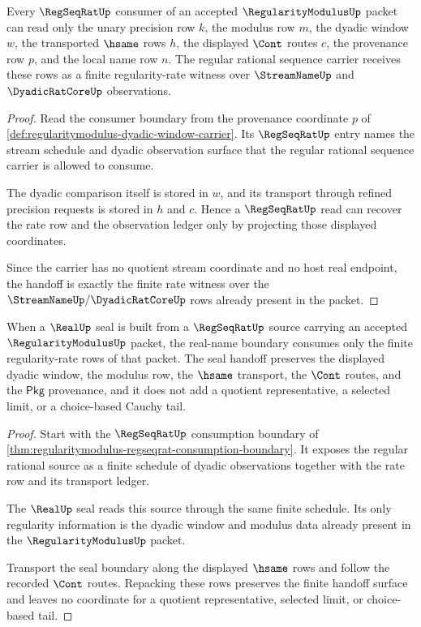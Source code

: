 \begin{theorem}
\label{thm:regularitymodulus-regseqrat-consumption-boundary}
Every $\RegSeqRatUp$ consumer of an accepted $\RegularityModulusUp$ packet can
read only the unary precision row $k$, the modulus row $m$, the dyadic window
$w$, the transported $\hsame$ rows $h$, the displayed $\Cont$ routes $c$, the
provenance row $p$, and the local name row $n$. The regular rational sequence
carrier receives these rows as a finite regularity-rate witness over
$\StreamNameUp$ and $\DyadicRatCoreUp$ observations.
\end{theorem}
\begin{proof}
Read the consumer boundary from the provenance coordinate $p$ of
\autoref{def:regularitymodulus-dyadic-window-carrier}. Its
$\RegSeqRatUp$ entry names the stream schedule and dyadic observation surface
that the regular rational sequence carrier is allowed to consume.

The dyadic comparison itself is stored in $w$, and its transport through
refined precision requests is stored in $h$ and $c$. Hence a
$\RegSeqRatUp$ read can recover the rate row and the observation ledger only
by projecting those displayed coordinates.

Since the carrier has no quotient stream coordinate and no host real endpoint,
the handoff is exactly the finite rate witness over the
$\StreamNameUp/\DyadicRatCoreUp$ rows already present in the packet.
\end{proof}

\begin{theorem}
\label{thm:regularitymodulus-realup-seal-handoff}
When a $\RealUp$ seal is built from a $\RegSeqRatUp$ source carrying an
accepted $\RegularityModulusUp$ packet, the real-name boundary consumes only
the finite regularity-rate rows of that packet. The seal handoff preserves the
displayed dyadic window, the modulus row, the $\hsame$ transport, the
$\Cont$ routes, and the $\mathsf{Pkg}$ provenance, and it does not add a
quotient representative, a selected limit, or a choice-based Cauchy tail.
\end{theorem}
\begin{proof}
Start with the $\RegSeqRatUp$ consumption boundary of
\autoref{thm:regularitymodulus-regseqrat-consumption-boundary}. It exposes the
regular rational source as a finite schedule of dyadic observations together
with the rate row and its transport ledger.

The $\RealUp$ seal reads this source through the same finite schedule. Its
only regularity information is the dyadic window and modulus data already
present in the $\RegularityModulusUp$ packet.

Transport the seal boundary along the displayed $\hsame$ rows and follow the
recorded $\Cont$ routes. Repacking these rows preserves the finite handoff
surface and leaves no coordinate for a quotient representative, selected
limit, or choice-based tail.
\end{proof}

